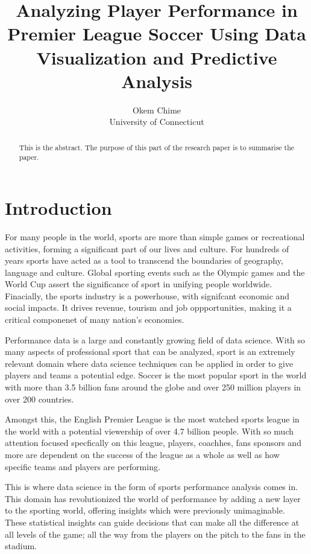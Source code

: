 \documentclass[12pt]{article}
\title{Analyzing Player Performance in Premier League Soccer Using 
Data Visualization and Predictive Analysis}
\author{Okem Chime\\
  University of Connecticut
}
\begin{document}
\maketitle

\begin{abstract}
This is the abstract. The purpose of this part of the research paper is to
summarise the paper.

\end{abstract}


\section{Introduction}
\label{sec:intro}




For many people in the world, sports are more than simple games or recreational
activities, forming a significant part of our lives and culture. For hundreds of
years sports have acted as a tool to transcend the boundaries of geography,
language and culture. Global sporting events such as the Olympic games and the
World Cup assert the significance of sport in unifying people worldwide.
Finacially, the sports industry is a powerhouse, with signifcant economic and
social impacts. It drives revenue, tourism and job oppportunities, making it a 
critical componenet of many nation's economies. 

Performance data is a large and constantly growing field of data science. With
so many aspects of professional sport that can be analyzed, sport is an 
extremely relevant domain where data science techniques can be applied in order
to give players and teams a potential edge. Soccer is the most popular sport in
the world with more than 3.5 billion fans around the globe and over 250 million
players in over 200 countries.

Amongst this, the English Premier League is the most watched sports league in
the world with a potential viewership of over 4.7 billion people. 
With so much attention focused specfically on this league,
players, coachhes, fans sponsors and more are dependent on the success of the
league as a whole as well as how specific teams and players are performing.

This is where data science in the form of sports performance analysis comes in.
This domain has revolutionized the world of performance by adding a new layer to
the sporting world, offering insights which were previously unimaginable. 
These  statistical insights can guide decisions that can make all the difference 
at all levels of the game; all the way from the players on the pitch to the fans
in the stadium.
\end{document}
